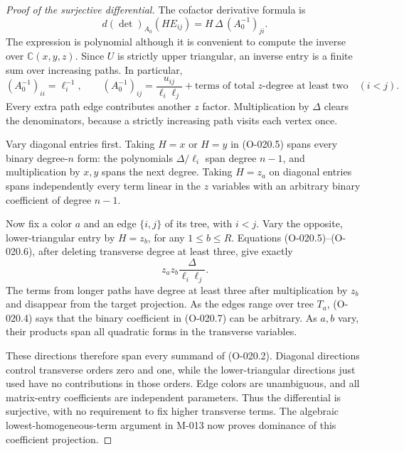 \begin{proof}[Proof of the surjective differential]
The cofactor derivative formula is
\[
             d(\det)_{A_0}(H E_{ij})
                         =H\,\Delta\,(A_0^{-1})_{ji}.
                                                               \tag{O-020.5}
\]
The expression is polynomial although it is convenient to
compute the inverse over $\mathbb C(x,y,z)$.
Since $U$ is strictly upper triangular, an inverse entry
is a finite sum over increasing paths. In particular,
\[
 (A_0^{-1})_{ii}=\ell_i^{-1},\qquad
 (A_0^{-1})_{ij}
       =\frac{u_{ij}}{\ell_i\ell_j}
                    +\text{terms of total $z$-degree at least two}
                       \quad(i<j).                    \tag{O-020.6}
\]
Every extra path edge contributes another $z$ factor.
Multiplication by $\Delta$ clears the denominators,
because a strictly increasing path visits each vertex once.

Vary diagonal entries first. Taking $H=x$ or $H=y$
in (O-020.5) spans every binary degree-$n$ form:
the polynomials $\Delta/\ell_i$ span degree $n-1$,
and multiplication by $x,y$ spans the next degree.
Taking $H=z_a$ on diagonal entries spans independently
every term linear in the $z$ variables with an arbitrary
binary coefficient of degree $n-1$.

Now fix a color $a$ and an edge $\{i,j\}$ of its tree,
with $i<j$. Vary the opposite, lower-triangular entry
by $H=z_b$, for any $1\leq b\leq R$.
Equations (O-020.5)--(O-020.6), after deleting transverse
degree at least three, give exactly
\[
                          z_az_b\frac{\Delta}{\ell_i\ell_j}.
                                                               \tag{O-020.7}
\]
The terms from longer paths have degree at least three
after multiplication by $z_b$ and disappear from the
target projection. As the edges range over tree $T_a$,
(O-020.4) says that the binary coefficient in (O-020.7)
can be arbitrary. As $a,b$ vary, their products span
all quadratic forms in the transverse variables.

These directions therefore span every summand of
(O-020.2). Diagonal directions control transverse orders
zero and one, while the lower-triangular directions just
used have no contributions in those orders. Edge colors
are unambiguous, and all matrix-entry coefficients are
independent parameters. Thus the differential is surjective,
with no requirement to fix higher transverse terms.
The algebraic lowest-homogeneous-term argument in M-013
now proves dominance of this coefficient projection.
\end{proof}

